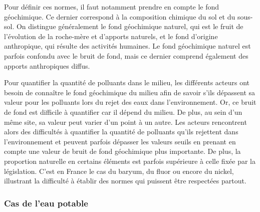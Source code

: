 \documentclass{article}
\begin{document}
Pour définir ces normes, il faut notamment prendre en compte le fond géochimique. Ce dernier correspond à la composition chimique du sol et du sous-sol. On distingue généralement le fond géochimique naturel, qui est le fruit de l'évolution de la roche-mère et d'apports naturels, et le fond d'origine anthropique, qui résulte des activités humaines. Le fond géochimique naturel est parfois confondu avec le  bruit de fond, mais ce dernier comprend également des apports anthropiques diffus.

Pour quantifier la quantité de polluants dans le milieu, les différents acteurs ont besoin de connaître le fond géochimique du milieu afin de savoir s’ils dépassent sa valeur pour les polluants lors du rejet des eaux dans l’environnement. Or, ce bruit de fond est difficile à quantifier car il dépend du milieu. De plus, au sein d’un même site, sa valeur peut varier d’un point à un autre. Les acteurs rencontrent alors des difficultés à quantifier la quantité de polluants qu’ils rejettent dans l’environnement et peuvent parfois dépasser les valeurs seuils en prenant en compte une valeur de bruit de fond géochimique plus importante. De plus, la proportion naturelle en certains éléments est parfois supérieure à celle fixée par la législation. C’est en France le cas du baryum, du fluor ou encore du nickel, illustrant la difficulté à établir des normes qui puissent être respectées partout.


\subsubsection{Cas de l’eau potable} 
\end{document}
